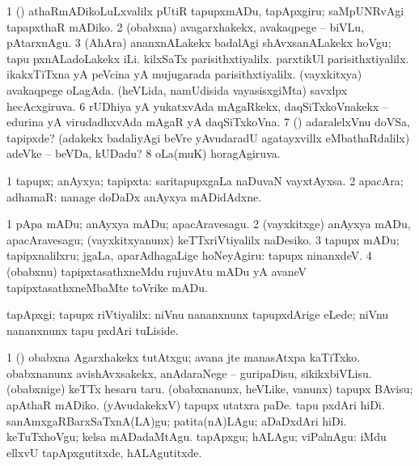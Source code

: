 {{{{{{\begin{center}
{{\noindent
\gl{\pagu}
\expl{}
\bmng
\bnum
\num{1}  (\rUpa) athaRmADikoLuLxvalilx pUtiR tapupxmADu, tapApxgiru; saMpUNRvAgi tapapxthaR mADiko. 
\num{2} (obabxna) avagarxhakekx, avakaqpege -- biVLu, pAtarxnAgu. 
\num{3}  (AhAra) ananxnALakekx badalAgi shAvxsanALakekx hoVgu; tapu pxnALadoLakekx iLi. 
  
\banum
{} kilxSaTx parisithxtiyalilx. 
 parxtikUl parisithxtiyalilx. 
 ikakxTiTxna yA peVcina yA mujugarada parisithxtiyalilx. 
\eanum
\numie
{}  
\banum
{} (vayxkitxya) avakaqpege oLagAda. 
 (heVLida, namUdisida vayasisxgiMta) savxlpx hecAcxgiruva. 
\eanum
\numie
\num{6}  rUDhiya yA yukatxvAda mAgaRkekx, daqSiTxkoVnakekx -- edurina yA virudadhxvAda mAgaR yA daqSiTxkoVna. 
\num{7} (\AmA) adaralelxVnu doVSa, tapipxde? (adakekx badaliyAgi beVre yAvudaradU agatayxvillx eMbathaRdalilx) adeVke -- beVDa, kUDadu? 
\num{8}  oLa(muK) horagAgiruva. 
\enum
\emng
\eentry

\bentry
{} 
\gl{\nA}
\expl{}
\bmng
\bnum
\num{1} tapupx; anAyxya; tapipxta:  saritapupxgaLa naDuvaN vayxtAyxsa. 
\num{2} apacAra; adhamaR:  nanage doDaDx anAyxya mADidAdxne. 
\enum
\emng

\noindent
\gl{\pagu}
\expl{}
\bmng
\bnum
\num{1} pApa mADu; anAyxya mADu; apacAravesagu. 
\num{2}  (vayxkitxge) anAyxya mADu, apacAravesagu; (vayxkitxyanunx) keTTxriVtiyalilx naDesiko. 
\num{3}  tapupx mADu; tapipxnalilxru; jgaLa, aparAdhagaLige hoNeyAgiru:  tapupx ninanxdeV. 
\num{4}  (obabxnu) tapipxtasathxneMdu rujuvAtu mADu yA avaneV tapipxtasathxneMbaMte toVrike mADu. 
\enum
\emng
\eentry

\bentry
{} 
\gl{\kirxvi}
\expl{}
\bmng
tapApxgi; tapupx riVtiyalilx:  niVnu nananxnunx tapupxdArige eLede; niVnu nananxnunx tapu pxdAri tuLiside. 
\emng

\noindent
\gl{\pagu}
\expl{}
\bmng
\bnum
\num{1}  (\AmA) obabxna Agarxhakekx tutAtxgu; avana jte manasAtxpa kaTiTxko. 
  
\banum
{} obabxnanunx avishAvxsakekx, anAdaraNege -- guripaDisu, sikikxbiVLisu. 
 (obabxnige) keTTx hesaru taru. 
\eanum
\numie
{}  
\banum
{} (obabxnanunx, heVLike, \mo vanunx) tapupx BAvisu; apAthaR mADiko. 
 (yAvudakekxV) tapupx utatxra paDe. 
\eanum
\numie
{}  
\banum
{} tapu pxdAri hiDi. 
 sanAmxgaRBarxSaTxnA(LA)gu; patita(nA)LAgu; aDaDxdAri hiDi. 
 keTuTxhoVgu; kelsa mADadaMtAgu. 
 tapApxgu; hALAgu; viPalnAgu:  iMdu ellxvU tapApxgutitxde, hALAgutitxde. 
\eanum
\numie
\enum
\emng
\eentry

}}
\end{center}}}}}}}
